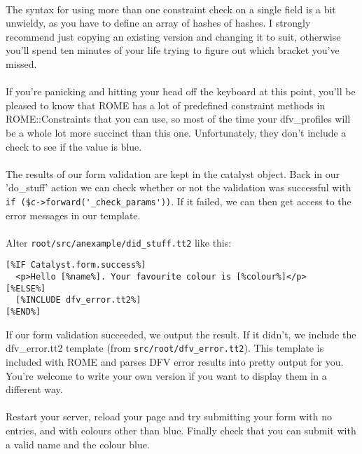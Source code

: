 \paragraph*{}
The syntax for using more than one constraint check on a single field is a bit unwieldy, as you have to define an array of hashes of hashes. I strongly recommend just copying an existing version and changing it to suit, otherwise you'll spend ten minutes of your life trying to figure out which bracket you've missed.

\paragraph*{}
If you're panicking and hitting your head off the keyboard at this point, you'll be pleased to know that ROME has a lot of pre\-defined constraint methods in ROME::Constraints that you can use, so most of the time your dfv\_profiles will be a whole lot more succinct than this one. Unfortunately, they don't include a check to see if the value is blue.

\paragraph*{}
The results of our form validation are kept in the catalyst object. Back in our 'do\_stuff' action we can check whether or not the validation was successful with \verb| if ($c->forward('_check_params'))|. If it failed, we can then get access to the error messages in our template. 

\paragraph*{}
Alter \verb|root/src/anexample/did_stuff.tt2| like this:

\begin{verbatim}
[%IF Catalyst.form.success%]
  <p>Hello [%name%]. Your favourite colour is [%colour%]</p>
[%ELSE%]
  [%INCLUDE dfv_error.tt2%]
[%END%]
\end{verbatim}

If our form validation succeeded, we output the result. If it didn't, we include the dfv\_error.tt2 template (from \verb|src/root/dfv_error.tt2|). This template is included with ROME and parses DFV error results into pretty output for you. You're welcome to write your own version if you want to display them in a different way.

\paragraph*{}
Restart your server, reload your page and try submitting your form with no entries, and with colours other than blue. Finally check that you can submit with a valid name and the colour blue.





